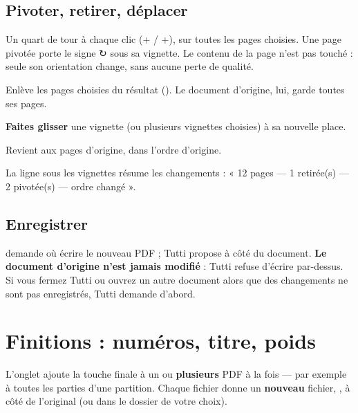 \subsection{Pivoter, retirer, déplacer}
\begin{description}[style=nextline,leftmargin=5mm,font=\sffamily\bfseries\color{bordeaux}]
\item[↺ Pivoter à gauche, ↻ Pivoter à droite]
Un quart de tour à chaque clic (+ / +), sur toutes les
pages choisies. Une page pivotée porte le signe ↻ sous sa vignette. Le contenu de la page n'est pas
touché : seule son orientation change, sans aucune perte de qualité.
\item[Retirer]
Enlève les pages choisies du résultat (). Le document d'origine, lui, garde toutes
ses pages.
\item[Déplacer]
\textbf{Faites glisser} une vignette (ou plusieurs vignettes choisies) à sa nouvelle place.
\item[Tout annuler]
Revient aux pages d'origine, dans l'ordre d'origine.
\end{description}
La ligne sous les vignettes résume les changements : « 12 pages — 1 retirée(s) — 2 pivotée(s) —
ordre changé ».

\subsection{Enregistrer}
 demande où écrire le nouveau PDF ; Tutti propose
 à côté du document. \textbf{Le document d'origine n'est jamais
modifié} : Tutti refuse d'écrire par-dessus. Si vous fermez Tutti ou ouvrez un autre document
alors que des changements ne sont pas enregistrés, Tutti demande d'abord.


\section{Finitions : numéros, titre, poids}\label{sec:finitions}

L'onglet  ajoute la touche finale à un ou \textbf{plusieurs} PDF à la fois — par
exemple à toutes les parties d'une partition. Chaque fichier donne un \textbf{nouveau} fichier,
, à côté de l'original (ou dans le dossier de votre choix).

